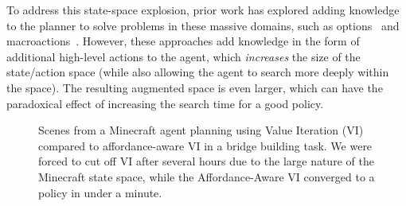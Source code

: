 \documentclass[]{article}
\begin{document}
To address this state-space explosion, prior work has explored adding
knowledge to the planner to solve problems in these
massive domains, such as options~\citep{sutton99} and
macroactions~\citep{Botea:2005kx,Newton:2005vn}. However, these
approaches add knowledge in the form of additional high-level actions
to the agent, which {\em increases} the size of the state/action space
(while also allowing the agent to search more deeply within the
space).  The resulting augmented space is even larger, which can have
the paradoxical effect of increasing the search time for a good
policy.

\begin{figure}
\centering
%
%
  \caption{Scenes from a Minecraft agent planning using Value
    Iteration (VI) compared to affordance-aware VI in a bridge building task. We were forced to cut off VI after several hours due to the large nature of the Minecraft state space, while the Affordance-Aware VI converged to a policy in under a minute.
\label{fig:minecraft}}
\end{figure}
\end{document}
